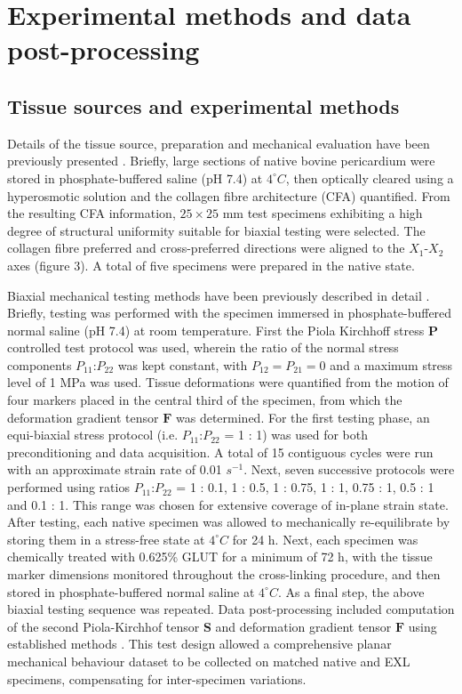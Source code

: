 \section{Experimental methods and data post-processing}

\subsection{Tissue sources and experimental methods} \label{c3:sec:21}

    Details of the tissue source, preparation and mechanical evaluation have been previously presented \cite{sun_biaxial_2003}. Briefly, large sections of native bovine pericardium were stored in phosphate-buffered saline (pH 7.4) at $4^\circ C$, then optically cleared using a hyperosmotic solution and the collagen fibre architecture (CFA) quantified. From the resulting CFA information, $25\times25$ mm test specimens exhibiting a high degree of structural uniformity suitable for biaxial testing were selected. The collagen fibre preferred and cross-preferred directions were aligned to the $X_1$-$X_2$ axes (figure 3). A total of five specimens were prepared in the native state.
    
    
    Biaxial mechanical testing methods have been previously described in detail \cite{sacks_orthotropic_1998}\cite{sacks_method_1999}. Briefly, testing was performed with the specimen immersed in phosphate-buffered normal saline (pH 7.4) at room temperature. First the Piola Kirchhoff stress $\mathbf{P}$ controlled test protocol was used, wherein the ratio of the normal stress components $P_{11}$:$P_{22}$ was kept constant, with $P_{12} = P_{21} = 0$ and a maximum stress level of 1 MPa was used. Tissue deformations were quantified from the motion of four markers placed in the central third of the specimen, from which the deformation gradient tensor $\mathbf{F}$ was determined. For the first testing phase, an equi-biaxial stress protocol (i.e. $P_{11}$:$P_{22}$ = 1 : 1) was used for both preconditioning and data acquisition. A total of 15 contiguous cycles were run with an approximate strain rate of 0.01 $s^{-1}$. Next, seven successive protocols were performed using ratios $P_{11}$:$P_{22}$ = 1 : 0.1, 1 : 0.5, 1 : 0.75, 1 : 1, 0.75 : 1, 0.5 : 1 and 0.1 : 1. This range was chosen for extensive coverage of in-plane strain state. After testing, each native specimen was allowed to mechanically re-equilibrate by storing them in a stress-free state at $4^\circ C$ for 24 h. Next, each specimen was chemically treated with 0.625\% GLUT for a minimum of 72 h, with the tissue marker dimensions monitored throughout the cross-linking procedure, and then stored in phosphate-buffered normal saline at $4^\circ C$. As a final step, the above biaxial testing sequence was repeated. Data post-processing included computation of the second Piola-Kirchhof tensor $\mathbf{S}$ and deformation gradient tensor $\mathbf{F}$ using established methods \cite{zhang_generalized_2015}. This test design allowed a comprehensive planar mechanical behaviour dataset to be collected on matched native and EXL specimens, compensating for inter-specimen variations.
    
